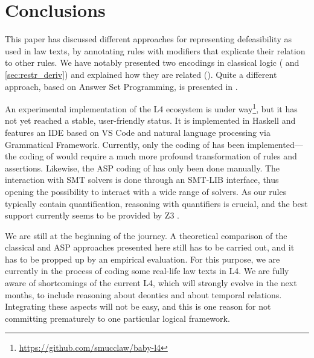 \section{Conclusions}\label{sec:conclusions}

This paper has discussed different approaches for representing defeasibility
as used in law texts, by annotating rules with modifiers that explicate their
relation to other rules. We have notably presented two encodings in classical
logic ( and \ref{sec:restr_deriv}) and explained
how they are related (). Quite a different approach,
based on Answer Set Programming, is presented in
.

An experimental implementation of the L4 ecosystem is under
way\footnote{\url{https://github.com/smucclaw/baby-l4}}, but it has not yet
reached a stable, user-friendly status. It is implemented in Haskell and features
an IDE based on VS Code and natural language processing via Grammatical
Framework\cite{ranta_grammatical_2004}. Currently, only the coding of
 has been implemented---the coding of
 would require a much more profound transformation of
rules and assertions. Likewise, the ASP coding of 
has only been done manually. The interaction with SMT solvers is done through
an SMT-LIB \cite{BarFT_SMTLIB} interface, thus opening the possibility to
interact with a wide range of solvers. As our rules typically contain
quantification, reasoning with quantifiers is crucial, and the best support
currently seems to be provided by Z3 \cite{demoura_bjorner_z3_2008}.

We are still at the beginning of the journey. A theoretical comparison of the
classical and ASP approaches presented here still has to be carried out, and
it has to be propped up by an empirical evaluation. For this purpose, we are
currently in the process of coding some real-life law texts in L4. We are
fully aware of shortcomings of the current L4, which will strongly evolve in
the next months, to include reasoning about deontics and about temporal
relations. Integrating these aspects will not be easy, and this is one reason
for not committing prematurely to one particular logical framework.


